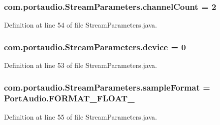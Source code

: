 \subsubsection[{\texorpdfstring{channel\+Count}{channelCount}}]{ com.\+portaudio.\+Stream\+Parameters.\+channel\+Count = 2}\hypertarget{classcom_1_1portaudio_1_1_stream_parameters_ad1a2370679544ee6c2bd6024a6b05af8}{}\label{classcom_1_1portaudio_1_1_stream_parameters_ad1a2370679544ee6c2bd6024a6b05af8}


Definition at line 54 of file Stream\+Parameters.\+java.

\subsubsection[{\texorpdfstring{device}{device}}]{ com.\+portaudio.\+Stream\+Parameters.\+device = 0}\hypertarget{classcom_1_1portaudio_1_1_stream_parameters_ae9bf046e666b5cd442c2231724c203b8}{}\label{classcom_1_1portaudio_1_1_stream_parameters_ae9bf046e666b5cd442c2231724c203b8}


Definition at line 53 of file Stream\+Parameters.\+java.

\subsubsection[{\texorpdfstring{sample\+Format}{sampleFormat}}]{ com.\+portaudio.\+Stream\+Parameters.\+sample\+Format = {\bf Port\+Audio.\+F\+O\+R\+M\+A\+T\+\_\+\+F\+L\+O\+A\+T\+\_}}\hypertarget{classcom_1_1portaudio_1_1_stream_parameters_a621e727a4cf3254fbb7e665d2b7a3489}{}\label{classcom_1_1portaudio_1_1_stream_parameters_a621e727a4cf3254fbb7e665d2b7a3489}


Definition at line 55 of file Stream\+Parameters.\+java.


